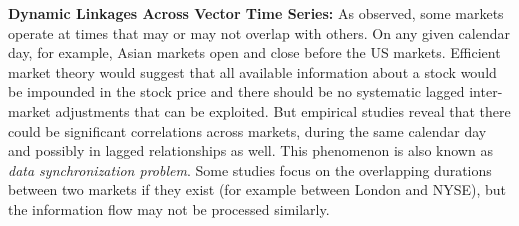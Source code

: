 \noindent \textbf{Dynamic Linkages Across Vector Time Series:} As observed, some markets operate at times that may or may not overlap with others. On any given calendar day, for example, Asian markets open and close before the US markets. Efficient market theory would suggest that all available information about a stock would be impounded in the stock price and there should be no systematic lagged inter-market adjustments that can be exploited. But empirical studies reveal that there could be significant correlations across markets, during the same calendar day and possibly in lagged relationships as well. This phenomenon is also known as \emph{data synchronization problem}. Some studies focus on the overlapping durations between two markets if they exist (for example between London and NYSE), but the information flow may not be processed similarly. 


